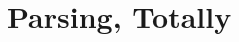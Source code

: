\documentclass[sigplan,review,anonymous]{acmart}\settopmatter{printfolios=true}
\begin{document}
\section{Parsing, Totally}



%


\end{document}
